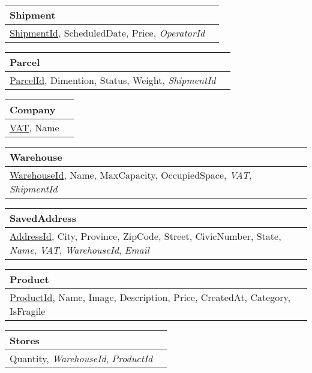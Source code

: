\begin{tabularx}{\textwidth}{YY}
    \toprule
    \textbf{Shipment} \\
    \midrule
    \underline{ShipmentId}, ScheduledDate, Price, \textit{OperatorId}  \\
    \bottomrule
\end{tabularx}

\begin{tabularx}{\textwidth}{YY}
    \toprule
    \textbf{Parcel} \\
    \midrule
    \underline{ParcelId}, Dimention, Status, Weight, \textit{ShipmentId}  \\
    \bottomrule
\end{tabularx}

\begin{tabularx}{\textwidth}{YY}
    \toprule
    \textbf{Company} \\
    \midrule
    \underline{VAT}, Name  \\
    \bottomrule
\end{tabularx}

\begin{tabularx}{\textwidth}{YY}
    \toprule
    \textbf{Warehouse} \\
    \midrule
    \underline{WarehouseId}, Name, MaxCapacity, OccupiedSpace, \textit{VAT}, \textit{ShipmentId} \\
    \bottomrule
\end{tabularx}

\begin{tabularx}{\textwidth}{YY}
    \toprule
    \textbf{SavedAddress} \\
    \midrule
    \underline{AddressId}, City, Province, ZipCode, Street, CivicNumber, State, \textit{Name}, \textit{VAT}, \textit{WarehouseId}, \textit{Email}  \\
    \bottomrule
\end{tabularx}

\begin{tabularx}{\textwidth}{YY}
    \toprule
    \textbf{Product} \\
    \midrule
    \underline{ProductId}, Name, Image, Description, Price, CreatedAt, Category, IsFragile \\
    \bottomrule
\end{tabularx}

\begin{tabularx}{\textwidth}{YY}
    \toprule
    \textbf{Stores} \\
    \midrule
    Quantity, \textit{WarehouseId}, \textit{ProductId} \\
    \bottomrule
\end{tabularx}

